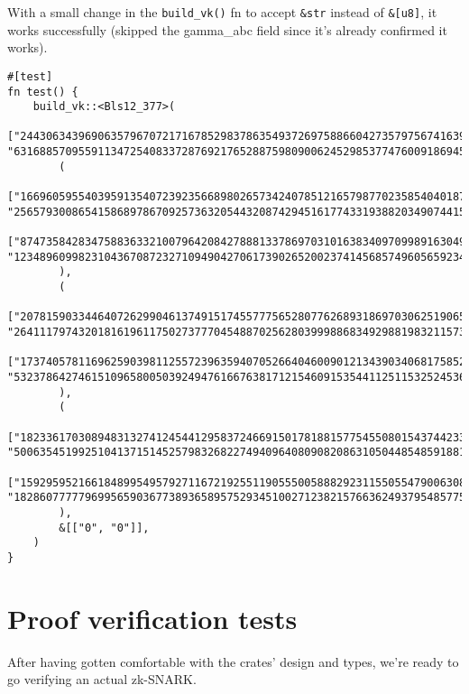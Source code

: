 \documentclass{article}
\newcommand{\inl}[1]{\lstinline{#1}}
\begin{document}
With a small change in the \inl{build_vk()} fn to accept \inl{&str} instead of \inl{&[u8]}, it works successfully (skipped the gamma_abc field since it's already confirmed it works).

\begin{lstlisting}
#[test]
fn test() {
    build_vk::<Bls12_377>(
        ["244306343969063579670721716785298378635493726975886604273579756741639953229415532528173059841495385161051909109889", "63168857095591134725408337287692176528875980900624529853774760091869452188562350014800651918572654790783920028544"],
        (
            ["166960595540395913540723923566898026573424078512165798770235854040187289225192916010951416820805112564604857674759", "256579300865415868978670925736320544320874294516177433193882034907441551828751116120797786447763257652992433074246"],
            ["87473584283475883633210079642084278881337869703101638340970998916304987007252265651123549659939971414867340710413", "123489609982310436708723271094904270617390265200237414568574960565923435716212526049371801011721780033997716837207"],
        ),
        (
            ["207815903344640726299046137491517455777565280776268931869703062519065330398931946294820126450478727867816749575328", "26411179743201816196117502737770454887025628039998868349298819832115736570578946577905207881058063637557577233081"],
            ["173740578116962590398112557239635940705266404600901213439034068175852581397457477553437876533246152293969399185346", "53237864274615109658005039249476166763817121546091535441125115325245366998581238918446431741630833736330879409260"],
        ),
        (
            ["182336170308948313274124544129583724669150178188157754550801543744233234403657037451296838109344679861568207613367", "50063545199251041371514525798326822749409640809082086310504485485918817418911777413389911727510843283856035409701"],
            ["159295952166184899549579271167219255119055500588829231155055479006308616522384365458479858992918918801397710916187", "182860777779699565903677389365895752934510027123821576636249379548577596319261062512490971767063470277595543086883"]
        ),
        &[["0", "0"]],
    )
}

\end{lstlisting}

\section{Proof verification tests}

After having gotten comfortable with the crates' design and types, we're ready to go verifying an actual zk-SNARK.
\end{document}
